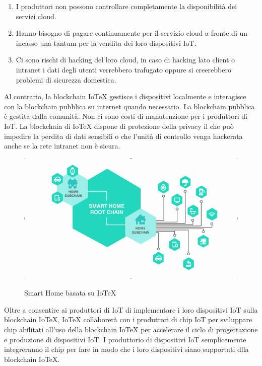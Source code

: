 \begin{enumerate}
    \item I produttori non possono controllare completamente la disponibilità dei servizi cloud.

    \item Hanno bisogno di pagare continuamente per il servizio cloud a fronte di un incasso una tantum per la vendita dei loro dispositivi IoT.

    \item Ci sono rischi di hacking del loro cloud, in caso di hacking lato client o intranet i dati degli utenti verrebbero trafugato oppure si creerebbero problemi di sicurezza domestica.
\end{enumerate}

Al contrario, la blockchain IoTeX gestisce i dispositivi localmente e interagisce con la blockchain pubblica su internet quando necessario. La blockchain pubblica è gestita dalla comunità. Non ci sono costi di manutenzione per i produttori di IoT. La blockchain di IoTeX dispone di protezione della privacy il che può impedire la perdita di dati sensibili o che l'unità di controllo venga hackerata anche se la rete intranet non è sicura.

\begin{figure}
    \centering
    \includegraphics[width=\textwidth]{Figura8}
    \label{fig:Figura8}
    \caption{Smart Home basata su IoTeX}
\end{figure}

Oltre a consentire ai produttori di IoT di implementare i loro dispositivi IoT sulla blockchain IoTeX, IoTeX collaborerà con i produttori di chip IoT per sviluppare chip abilitati all'uso della blockchain IoTeX per accelerare il ciclo di progettazione e produzione di dispositivi IoT. I produttorio di dispositivi IoT semplicemente integreranno il chip per fare in modo che i loro dispositivi siano supportati dlla blockchain IoTeX.


